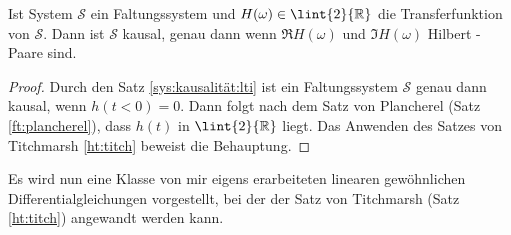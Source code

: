 \begin{kor} 
	Ist System $\mathscr{S}$ ein Faltungssystem und $H(\omega) \in \lint{2}{\mathbb{R}}$ die Transferfunktion von $\mathscr{S}$. Dann ist $\mathscr{S}$ kausal, genau dann wenn $\Re{H(\omega)}$ und $\Im{H(\omega)}$ Hilbert - Paare sind.
	\begin{proof}
	Durch den Satz \ref{sys:kausalität:lti} ist ein Faltungssystem $\mathscr{S}$ genau dann kausal, wenn $h(t < 0) = 0$. Dann folgt nach dem Satz von Plancherel (Satz \ref{ft:plancherel}), dass $h(t)$ in $\lint{2}{\mathbb{R}}$ liegt.
	Das Anwenden des Satzes von Titchmarsh \ref{ht:titch} beweist die Behauptung.  
	\end{proof}
\end{kor}

Es wird nun eine Klasse von mir eigens erarbeiteten linearen gewöhnlichen Differentialgleichungen vorgestellt, bei der der Satz von Titchmarsh (Satz \ref{ht:titch}) angewandt werden kann.

